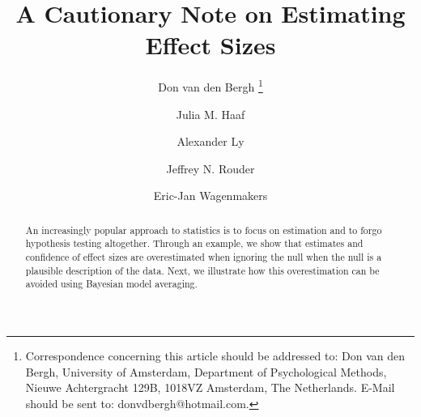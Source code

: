 \documentclass[a4paper]{article}
\title{A Cautionary Note on Estimating Effect Sizes}
\author[1]{Don van den Bergh%
	\thanks{Correspondence concerning this article should be addressed to: Don van den Bergh, University of Amsterdam, Department of Psychological Methods, Nieuwe Achtergracht 129B, 1018VZ Amsterdam, The Netherlands. E-Mail should be sent to: donvdbergh@hotmail.com.
}}
\author[1]{Julia M. Haaf}
\author[1,2]{Alexander Ly}
\author[3]{\authorcr Jeffrey N. Rouder} %
\author[1]{Eric-Jan Wagenmakers}
\affil[1]{University of Amsterdam}
\affil[2]{Centrum Wiskunde \& Informatica}
\affil[3]{University of California Irvine}
\date{}
\begin{document}
\tbEffectSizeExample
{}\reanalysis


\maketitle

\begin{abstract}
	An increasingly popular approach to statistics is to focus on estimation and to forgo hypothesis testing altogether. Through an example, we show that estimates and confidence of effect sizes are overestimated when ignoring the null when the null is a plausible description of the data. Next, we illustrate how this overestimation can be avoided using Bayesian model averaging. %
\end{abstract}
\end{document}
